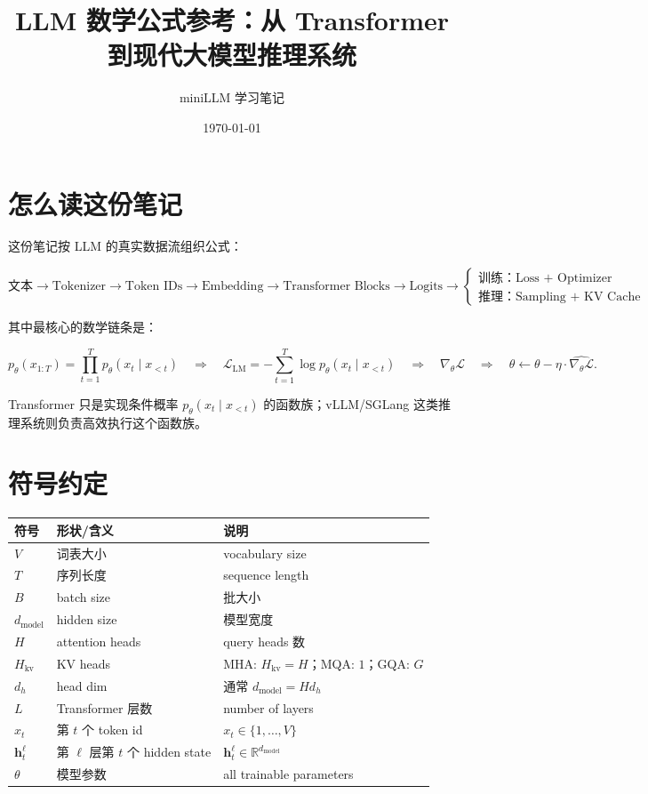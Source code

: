 \documentclass[UTF8,12pt]{ctexart}
\title{LLM 数学公式参考：从 Transformer 到现代大模型推理系统}
\author{miniLLM 学习笔记}
\date{\today}
\newcommand{\R}{\mathbb{R}}
\newcommand{\1}{\mathbf{1}}
\begin{document}
\maketitle
\tableofcontents
\newpage

\section{怎么读这份笔记}

这份笔记按 LLM 的真实数据流组织公式：

\[
\text{文本}
\rightarrow \text{Tokenizer}
\rightarrow \text{Token IDs}
\rightarrow \text{Embedding}
\rightarrow \text{Transformer Blocks}
\rightarrow \text{Logits}
\rightarrow
\begin{cases}
\text{训练：Loss + Optimizer}\\
\text{推理：Sampling + KV Cache}
\end{cases}
\]

其中最核心的数学链条是：

\[
p_\theta(x_{1:T})
=\prod_{t=1}^{T}p_\theta(x_t\mid x_{<t})
\quad\Longrightarrow\quad
\mathcal{L}_{\mathrm{LM}}
=-\sum_{t=1}^{T}\log p_\theta(x_t\mid x_{<t})
\quad\Longrightarrow\quad
\nabla_\theta \mathcal{L}
\quad\Longrightarrow\quad
\theta \leftarrow \theta-\eta \cdot \widehat{\nabla_\theta \mathcal{L}}.
\]

Transformer 只是实现条件概率 $p_\theta(x_t\mid x_{<t})$ 的函数族；vLLM/SGLang 这类推理系统则负责高效执行这个函数族。

\section{符号约定}

\begin{longtable}{lll}
\toprule
符号 & 形状/含义 & 说明\\
\midrule
$V$ & 词表大小 & vocabulary size\\
$T$ & 序列长度 & sequence length\\
$B$ & batch size & 批大小\\
$d_{\mathrm{model}}$ & hidden size & 模型宽度\\
$H$ & attention heads & query heads 数\\
$H_{\mathrm{kv}}$ & KV heads & MHA: $H_{\mathrm{kv}}=H$；MQA: $1$；GQA: $G$\\
$d_h$ & head dim & 通常 $d_{\mathrm{model}}=H d_h$\\
$L$ & Transformer 层数 & number of layers\\
$x_t$ & 第 $t$ 个 token id & $x_t\in\{1,\dots,V\}$\\
$\bm{h}_t^\ell$ & 第 $\ell$ 层第 $t$ 个 hidden state & $\bm{h}_t^\ell\in\R^{d_{\mathrm{model}}}$\\
$\theta$ & 模型参数 & all trainable parameters\\
\bottomrule
\end{longtable}
\end{document}
